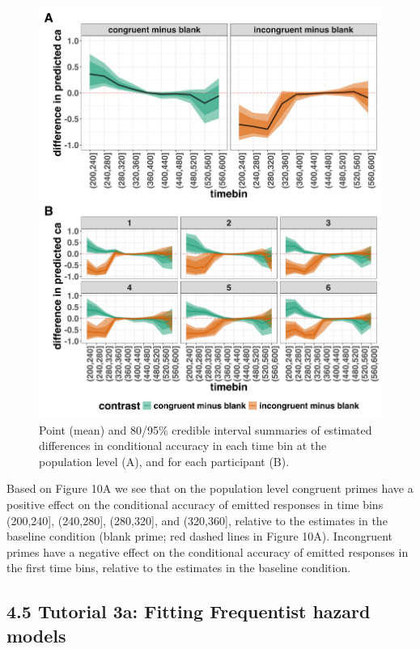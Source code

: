 \documentclass[
  man, donotrepeattitle,floatsintext]{apa6}
\begin{document}
\begin{figure}[H]

{\centering \includegraphics[width=0.8\linewidth,height=0.67\textheight,]{../Tutorial_2_Bayesian/figures/M1i_ca_ame_combined} 

}

\caption{Point (mean) and 80/95\% credible interval summaries of estimated differences in conditional accuracy in each time bin at the population level (A), and for each participant (B).}\label{fig:plot-ca-grand-ame-effects}
\end{figure}

Based on Figure 10A we see that on the population level congruent primes have a positive effect on the conditional accuracy of emitted responses in time bins (200,240{]}, (240,280{]}, (280,320{]}, and (320,360{]}, relative to the estimates in the baseline condition (blank prime; red dashed lines in Figure 10A).
Incongruent primes have a negative effect on the conditional accuracy of emitted responses in the first time bins, relative to the estimates in the baseline condition.

\subsection{4.5 Tutorial 3a: Fitting Frequentist hazard models}\label{tutorial-3a-fitting-frequentist-hazard-models}
\end{document}
